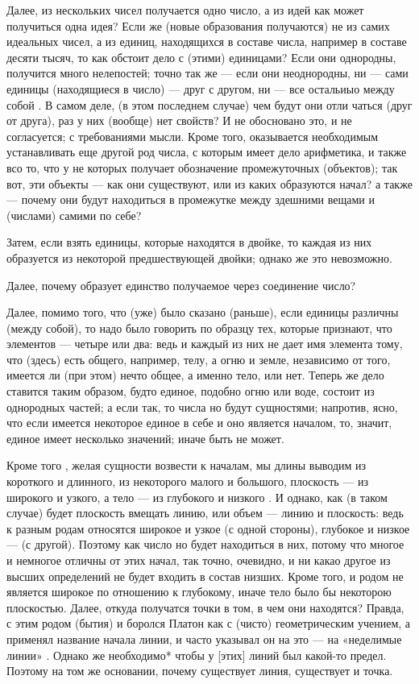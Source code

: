 \documentclass{article}
\begin{document}
Далее, из нескольких чисел получается одно число, а из идей как может получиться одна идея?
\footnotemark[21]
Если же (новые образования получаются) не из самих идеальных чисел, а из единиц, находящихся в составе числа, например в составе десяти тысяч, то как обстоит дело с (этими) единицами? Если они однородны, получится много нелепостей;
\footnotemark[22]
точно так же --- если они неоднородны, ни --- сами единицы (находящиеся в число) --- друг с другом, ни --- все остальиыо между собой . В самом деле, (в этом последнем случае) чем будут они отли чаться (друг от друга), раз у них (вообще) нет свойств? И не обосновано это, и не согласуется; с требованиями мысли. Кроме того, оказывается необходимым устанавливать еще другой род числа, с которым имеет дело арифметика, и также всо то, что у не которых получает обозначение промежуточных (объектов); так вот, эти объекты --- как они существуют, или из каких образуются начал?
\footnotemark[23]
а также --- почему они будут находиться в промежутке между здешними вещами и (числами) самими по себе?

Затем, если взять единицы, которые находятся в двойке, то каждая из них образуется из некоторой предшествующей двойки;
\footnotemark[24]
однако же это невозможно.

Далее, почему образует единство получаемое через соединение число?
\footnotemark[25]


Далее, помимо того, что (уже) было сказано (раньше), если единицы различны (между собой), то надо было говорить по образцу тех, которые признают, что элементов --- четыре или два: ведь и каждый из них не дает имя элемента тому, что (здесь) есть общего, например, телу, а огню и земле, независимо от того, имеется ли (при этом) нечто общее, а именно тело, или нет. Теперь же дело ставится таким образом, будто единое, подобно огню или воде, состоит из однородных частей; а если так, то числа но будут сущностями;
\footnotemark[26]
напротив, ясно, что если имеется некоторое единое в себе и оно является началом, то, значит, единое имеет несколько значений;
\footnotemark[27]
иначе быть не может.

Кроме того , желая сущности возвести к началам, мы  длины  выводим из короткого и длинного, из некоторого малого и большого, плоскость --- из широкого и узкого, а тело --- из глубокого и низкого . И однако, как (в таком случае)
\footnotemark[28]
будет плоскость вмещать линию, или объем --- линию и плоскость: ведь к разным родам относятся широкое и узкое (с одной стороны), глубокое и низкое --- (с другой). Поэтому как число но будет находиться в них,
\footnotemark[29]
потому что многое и немногое отличны от этих начал,
\footnotemark[30]
так точно, очевидно, и ни какао другое из высших определений не будет входить в состав низших. Кроме того, и родом не является широкое по отношению к глубокому, иначе тело было бы некоторою плоскостью. Далее, откуда получатся точки в том, в чем они находятся?
\footnotemark[31]
Правда, с этим родом (бытия) и боролся Платон как с (чисто) геометрическим учением, а применял название начала линии, и часто указывал он на это --- на «неделимые линии» . Однако же необходимо* чтобы у [этих] линий был какой-то предел. Поэтому на том же основании, почему существует линия, существует и точка.
\footnotemark[32]
\end{document}
